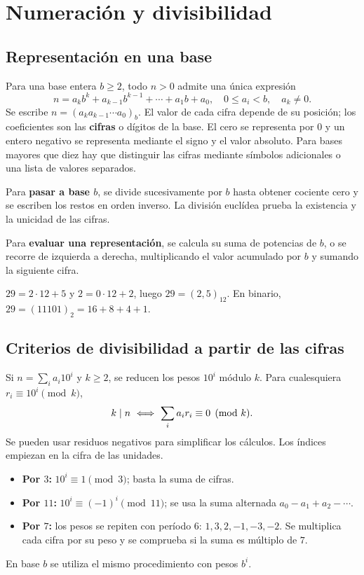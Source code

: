 \chapter{Numeración y divisibilidad}
\label{md:numeracion}

\section{Representación en una base}

Para una base entera $b\ge2$, todo $n>0$ admite una única expresión
\[
 n=a_kb^k+a_{k-1}b^{k-1}+\cdots+a_1b+a_0,
 \quad 0\le a_i<b,\quad a_k\ne0.
\]
Se escribe $n=(a_ka_{k-1}\cdots a_0)_b$.
El valor de cada cifra depende de su posición; los coeficientes son
las \textbf{cifras} o dígitos de la base. El cero se representa por $0$
y un entero negativo se representa mediante el signo y el valor absoluto.
Para bases mayores que diez hay que distinguir las cifras mediante
símbolos adicionales o una lista de valores separados.

Para \textbf{pasar a base $b$}, se divide sucesivamente por $b$ hasta
obtener cociente cero y se escriben los restos en orden inverso.
La división euclídea prueba la existencia y la unicidad de las cifras.

Para \textbf{evaluar una representación}, se calcula su suma de potencias
de $b$, o se recorre de izquierda a derecha, multiplicando el valor
acumulado por $b$ y sumando la siguiente cifra.

\begin{ejemplo}
$29=2\cdot12+5$ y $2=0\cdot12+2$, luego $29=(2,5)_{12}$.
En binario, $29=(11101)_2=16+8+4+1$.
\end{ejemplo}

\section{Criterios de divisibilidad a partir de las cifras}

Si $n=\sum_i a_i10^i$ y $k\ge2$, se reducen los pesos
$10^i$ módulo $k$. Para cualesquiera $r_i\equiv10^i\pmod k$,
\[
 k\mid n\ \Longleftrightarrow\ \sum_i a_ir_i\equiv0\pmod k.
\]
Se pueden usar residuos negativos para simplificar los cálculos.
Los índices empiezan en la cifra de las unidades.

\begin{itemize}
 \item \textbf{Por $3$:} $10^i\equiv1\pmod3$; basta la suma de cifras.
 \item \textbf{Por $11$:} $10^i\equiv(-1)^i\pmod{11}$;
       se usa la suma alternada $a_0-a_1+a_2-\cdots$.
 \item \textbf{Por $7$:} los pesos se repiten con período $6$:
       $1,3,2,-1,-3,-2$. Se multiplica cada cifra por su peso y
       se comprueba si la suma es múltiplo de $7$.
\end{itemize}
En base $b$ se utiliza el mismo procedimiento con pesos $b^i$.

